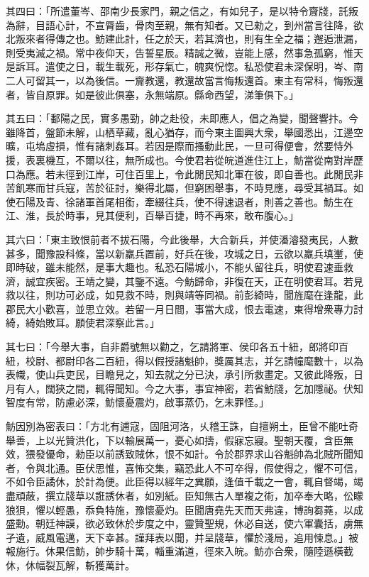 \begin{pinyinscope}
 
 其四曰：「所遣董岑、邵南少長家門，親之信之，有如兒子，是以特令齎牋，託叛為辭，目語心計，不宣脣齒，骨肉至親，無有知者。又已勑之，到州當言往降，欲北叛來者得傳之也。魴建此計，任之於天，若其濟也，則有生全之福；邂逅泄漏，則受夷滅之禍。常中夜仰天，告誓星辰。精誠之微，豈能上感，然事急孤窮，惟天是訴耳。遣使之日，載生載死，形存氣亡，魄爽怳惚。私恐使君未深保明，岑、南二人可留其一，以為後信。一齎教還，教還故當言悔叛還首。東主有常科，悔叛還者，皆自原罪。如是彼此俱塞，永無端原。縣命西望，涕筆俱下。」
 
 
 
 
 其五曰：「鄱陽之民，實多愚勁，帥之赴役，未即應人，倡之為變，聞聲響抃。今雖降首，盤節未解，山栖草藏，亂心猶存，而今東主圖興大衆，舉國悉出，江邊空曠，屯塢虛損，惟有諸刺姦耳。若因是際而搔動此民，一旦可得便會，然要恃外援，表裏機互，不爾以往，無所成也。今使君若從皖道進住江上，魴當從南對岸歷口為應。若未徑到江岸，可住百里上，令此閒民知北軍在彼，即自善也。此閒民非苦飢寒而甘兵寇，苦於征討，樂得北屬，但窮困舉事，不時見應，尋受其禍耳。如使石陽及青、徐諸軍首尾相銜，牽綴往兵，使不得速退者，則善之善也。魴生在江、淮，長於時事，見其便利，百舉百捷，時不再來，敢布腹心。」
 
 
 
 
 其六曰：「東主致恨前者不拔石陽，今此後舉，大合新兵，并使潘濬發夷民，人數甚多，聞豫設科條，當以新羸兵置前，好兵在後，攻城之日，云欲以羸兵填壍，使即時破，雖未能然，是事大趣也。私恐石陽城小，不能乆留往兵，明使君速垂救濟，誠宜疾密。王靖之變，其鑒不遠。今魴歸命，非復在天，正在明使君耳。若見救以往，則功可必成，如見救不時，則與靖等同禍。前彭綺時，聞旌麾在逢龍，此郡民大小歡喜，並思立效。若留一月日間，事當大成，恨去電速，東得增衆專力討綺，綺始敗耳。願使君深察此言。」
 
 
 
 
 其七曰：「今舉大事，自非爵號無以勸之，乞請將軍、侯印各五十紐，郎將印百紐，校尉、都尉印各二百紐，得以假授諸魁帥，獎厲其志，并乞請幢麾數十，以為表幟，使山兵吏民，目瞻見之，知去就之分已決，承引所救畫定。又彼此降叛，日月有人，闊狹之間，輒得聞知。今之大事，事宜神密，若省魴牋，乞加隱祕。伏知智度有常，防慮必深，魴懷憂震灼，啟事蒸仍，乞未罪怪。」
 
 
 
 
 魴因別為密表曰：「方北有逋寇，固阻河洛，乆稽王誅，自擅朔土，臣曾不能吐奇舉善，上以光贊洪化，下以輸展萬一，憂心如擣，假寐忘寢。聖朝天覆，含臣無效，猥發優命，勑臣以前誘致賊休，恨不如計。令於郡界求山谷魁帥為北賊所聞知者，令與北通。臣伏思惟，喜怖交集，竊恐此人不可卒得，假使得之，懼不可信，不如令臣譎休，於計為便。此臣得以經年之兾願，逢值千載之一會，輒自督竭，竭盡頑蔽，撰立牋草以誑誘休者，如別紙。臣知無古人單複之術，加卒奉大略，伀矇狼狽，懼以輕愚，忝負特施，豫懷憂灼。臣聞唐堯先天而天弗違，博詢芻蕘，以成盛勳。朝廷神謨，欲必致休於步度之中，靈贊聖規，休必自送，使六軍囊括，虜無孑遺，威風電邁，天下幸甚。謹拜表以聞，并呈牋草，懼於淺局，追用悚息。」被報施行。休果信魴，帥步騎十萬，輜重滿道，徑來入皖。魴亦合衆，隨陸遜橫截休，休幅裂瓦解，斬獲萬計。
 

\end{pinyinscope}
